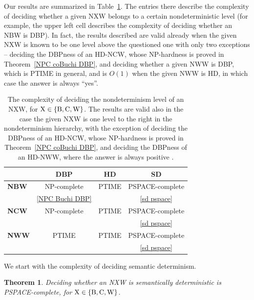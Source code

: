 \documentclass[10pt,a4paper]{amsart}
\newtheorem{thm}{Theorem}[section]
\theoremstyle{definition}
\numberwithin{equation}{section}
\newcommand{\nxw}{NXW\xspace}
\begin{document}
 
Our results are summarized in Table~\ref{level}. The entries there describe the complexity of deciding whether a given \nxw belongs to a certain nondeterministic level (for example, the upper left cell describes the complexity of deciding whether an NBW is DBP). In fact, the results described are valid already when the given \nxw is known to be one level above the questioned one with only two exceptions -- deciding the DBPness of an HD-NCW, whose NP-hardness is proved in Theorem~\ref{NPC coBuchi DBP}, and deciding whether a given NWW is DBP, which is PTIME in general, and is $O(1)$ when the given NWW is HD, in which case the answer is always ``yes''. 
\begin{table}[ht!] %
	\begin{center}
		\label{tab:table1}
		\begin{tabular}{lccc}
							&\textbf{DBP}				& \textbf{HD} 		& \textbf{SD}			\\
			\midrule 
			\textbf{NBW} 	& NP-complete 				& PTIME 			& PSPACE-complete	 	\\
							& \autoref{NPC Buchi DBP}	& \cite{BK18} 		& \autoref{sd pspace}	\\
			\midrule
			\textbf{NCW} 	& NP-complete 				& PTIME 			& PSPACE-complete 		\\
							& \cite{KM18}				& \cite{KS15}	 	& \autoref{sd pspace}	\\
			\midrule
			\textbf{NWW}	& PTIME 					& PTIME 			& PSPACE-complete 		\\
							& \cite{KS15,BK18}			& \cite{KS15,BK18} 	& \autoref{sd pspace}	\\
		\end{tabular}
	\end{center}
	\caption{The complexity of deciding the nondeterminism level of an \nxw, for ${\rm X} \in \{{\rm B,C,W}\}$. 
		The results are valid also in the case the given \nxw is one level to the right in the nondeterminism hierarchy, with the exception of deciding the DBPness of an HD-NCW, whose NP-hardness is proved in Theorem~\ref{NPC coBuchi DBP}, and deciding the DBPness of an HD-NWW, where the answer is always positive \cite{BKS17}.}
	\label{level}
\end{table}

We start with the complexity of deciding semantic determinism. 


\begin{thm}
\label{sd pspace}
Deciding whether an \nxw is semantically deterministic is PSPACE-complete, for ${\rm X} \in \{{\rm B,C,W}\}$.
\end{thm}
\end{document}
